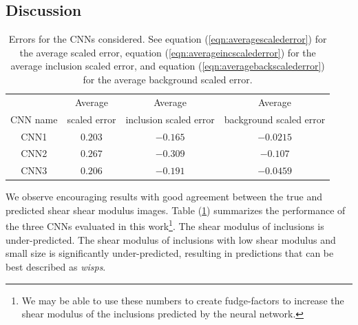 \documentclass[12pt]{article}
\newcommand{\ra}[1]{\renewcommand{\arraystretch}{#1}}
\begin{document}
\subsection{\label{sect:discussion}Discussion}
\begin{table}\centering
  \ra{1.3}
  \begin{tabular}{c|ccc}
    \toprule
                              & Average      & Average                & Average\\
            CNN name          & scaled error & inclusion scaled error & background scaled error\\
    \midrule
    CNN1                      & $0.203$   & $-0.165$     & $-0.0215$     \\
    CNN2                      & $0.267$   & $-0.309$     & $-0.107$      \\
    CNN3                      & $0.206$   & $-0.191$     & $-0.0459$     \\
  \bottomrule  
  \end{tabular}
  \caption{\label{table:cnnstatsummary} Errors for the CNNs considered. See equation (\ref{eqn:averagescalederror}) for the average scaled error, equation (\ref{eqn:averageincscalederror}) for the average inclusion scaled error, and equation (\ref{eqn:averagebackscalederror}) for the average background scaled error.}
\end{table}
%
We observe encouraging results with good agreement between the true and predicted shear shear modulus images. Table (\ref{table:cnnstatsummary}) summarizes the performance of the three CNNs evaluated in this work\footnote{We may be able to use these numbers to create fudge-factors to increase the shear modulus of the inclusions predicted by the neural network.}. The shear modulus of inclusions is under-predicted. The shear modulus of inclusions with low shear modulus and small size is significantly under-predicted, resulting in predictions that can be best described as \textit{wisps}.
\end{document}
